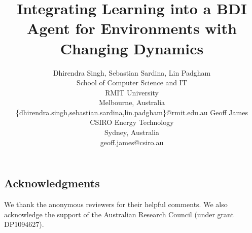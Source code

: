 \documentclass{article}
\title{Integrating Learning into a BDI Agent for Environments with Changing Dynamics}
\author{
Dhirendra Singh, Sebastian Sardina, Lin Padgham\\
School of Computer Science and IT \\
RMIT University\\
Melbourne, Australia\\
{\normalsize\textsf{\{dhirendra.singh,sebastian.sardina,lin.padgham\}@rmit.edu.au}}
\And
Geoff James\\
CSIRO Energy Technology\\
Sydney, Australia\\
{\normalsize \textsf{geoff.james@csiro.au}}
}
\begin{document}
\maketitle

\begin{abstract}

\end{abstract}











\subsection*{Acknowledgments}

We thank the anonymous reviewers for their helpful comments. We also acknowledge the support of the Australian Research Council (under grant DP1094627).
\small


\end{document}
